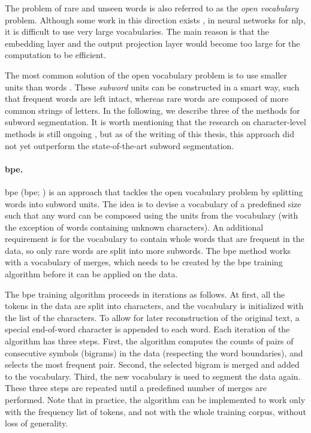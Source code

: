 The problem of rare and unseen words is also referred to as the \emph{open
  vocabulary} problem. Although some work in this direction exists
\citep{jean-etal-2015-using}, in neural networks for \ac{nlp}, it is difficult
to use very large vocabularies. The main reason is that the embedding layer and
the output projection layer would become too large for the computation to be
efficient.

The most common solution of the open vocabulary problem is to use smaller units
than words \citep{sennrich-etal-2016-neural}. These \emph{subword} units can be
constructed in a smart way, such that frequent words are left intact, whereas
rare words are composed of more common strings of letters. In the following, we
describe three of the methods for subword segmentation. It is worth mentioning
that the research on character-level methods is still ongoing
\citep{chung-etal-2016-character,lee-etal-2017-fully,gao-etal-2020-character},
but as of the writing of this thesis, this approach did not yet outperform the
state-of-the-art subword segmentation.

\paragraph{\acs{bpe}.}  \Acl{bpe}  (\acs{bpe};
\citealp{sennrich-etal-2016-neural}) is an approach that tackles the open
vocabulary problem by splitting words into subword units.  The idea is to
devise a vocabulary of a predefined size such that any word can be composed
using the units from the vocabulary (with the exception of words containing
unknown characters). An additional requirement is for the vocabulary to contain
whole words that are frequent in the data, so only rare words are split into
more subwords. The \ac{bpe} method works with a vocabulary of merges, which
needs to be created by the \ac{bpe} training algorithm before it can be applied
on the data.

The \ac{bpe} training algorithm proceeds in iterations as follows.  At first,
all the tokens in the data are split into characters, and the vocabulary is
initialized with the list of the characters. To allow for later reconstruction
of the original text, a special end-of-word character is appended to each word.
Each iteration of the algorithm has three steps. First, the algorithm computes
the counts of pairs of consecutive symbols (bigrams) in the data (respecting
the word boundaries), and selects the most frequent pair. Second, the selected
bigram is merged and added to the vocabulary. Third, the new vocabulary is used
to segment the data again. These three steps are repeated until a predefined
number of merges are performed.  Note that in practice, the algorithm can be
implemented to work only with the frequency list of tokens, and not with the
whole training corpus, without loss of generality.

